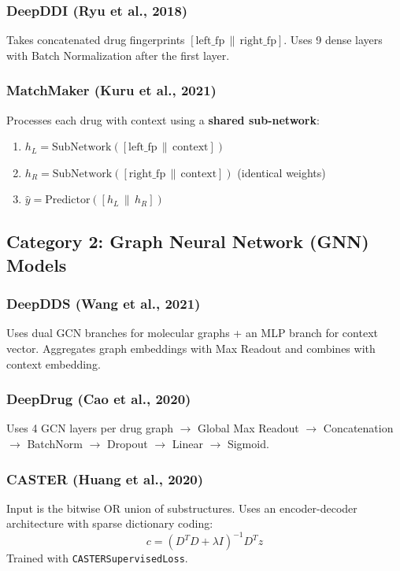 \documentclass[12pt,a4paper,oneside]{article}
\begin{document}
\subsubsection{DeepDDI (Ryu et al., 2018)}
Takes concatenated drug fingerprints $[\text{left\_fp} \,\|\, \text{right\_fp}]$. Uses 9 dense layers with Batch Normalization after the first layer.

\subsubsection{MatchMaker (Kuru et al., 2021)}
Processes each drug with context using a \textbf{shared sub-network}:
\begin{enumerate}
  \item $h_L = \text{SubNetwork}([\text{left\_fp} \,\|\, \text{context}])$
  \item $h_R = \text{SubNetwork}([\text{right\_fp} \,\|\, \text{context}])$ \quad (identical weights)
  \item $\hat{y} = \text{Predictor}([h_L \,\|\, h_R])$
\end{enumerate}

\subsection{Category 2: Graph Neural Network (GNN) Models}

\subsubsection{DeepDDS (Wang et al., 2021)}
Uses dual GCN branches for molecular graphs + an MLP branch for context vector. Aggregates graph embeddings with Max Readout and combines with context embedding.

\subsubsection{DeepDrug (Cao et al., 2020)}
Uses 4 GCN layers per drug graph $\to$ Global Max Readout $\to$ Concatenation $\to$ BatchNorm $\to$ Dropout $\to$ Linear $\to$ Sigmoid.

\subsubsection{CASTER (Huang et al., 2020)}
Input is the bitwise OR union of substructures. Uses an encoder-decoder architecture with sparse dictionary coding:
\[
c = (D^T D + \lambda I)^{-1} D^T z
\]
Trained with \texttt{CASTERSupervisedLoss}.
\end{document}
